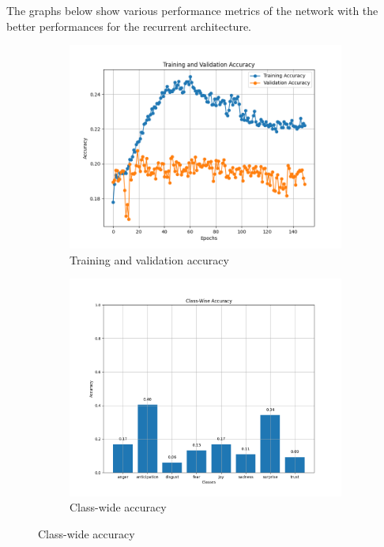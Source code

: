 The graphs below show various performance metrics of the network with the better
performances for the recurrent architecture.
\begin{figure}[H]
    \centering
    \begin{subfigure}{0.48\textwidth}
        \includegraphics[width=\textwidth]{pictures/rnn_accuracy.png}
        \caption{Training and validation accuracy}
        \label{fig:rnn_train_val_acc}
    \end{subfigure}
    \begin{subfigure}{0.5\textwidth}
        \includegraphics[width=\textwidth]{pictures/rnn_class_accuracy.png}
        \caption{Class-wide accuracy}

\end{subfigure}
\end{figure}
